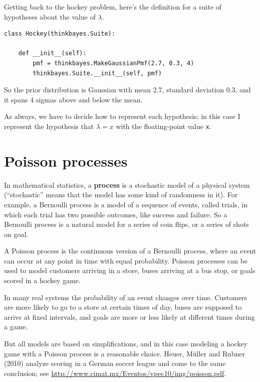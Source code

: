\documentclass[12pt]{book}
\begin{document}
Getting back to the hockey problem, here's the definition for a suite
of hypotheses about the value of $\lambda$.

\begin{verbatim}
class Hockey(thinkbayes.Suite):

    def __init__(self):
        pmf = thinkbayes.MakeGaussianPmf(2.7, 0.3, 4)
        thinkbayes.Suite.__init__(self, pmf)
\end{verbatim}  

So the prior distribution is Gaussian with mean 2.7, standard deviation
0.3, and it spans 4 sigmas above and below the mean.

As always, we have to decide how to represent each hypothesis; in
this case I represent the hypothesis that $\lambda=x$ with the
floating-point value {\tt x}. 


\section{Poisson processes}

In mathematical statistics, a {\bf process} is a stochastic model of a
physical system (``stochastic'' means that the model has some kind of
randomness in it).  For example, a Bernoulli process is a model of a
sequence of events, called trials, in which each trial has two
possible outcomes, like success and failure.  So a Bernoulli process
is a natural model for a series of coin flips, or a series of shots on
goal.   

A Poisson process is the continuous version of a Bernoulli process,
where an event can occur at any point in time with equal probability.
Poisson processes can be used to model customers arriving in a store,
buses arriving at a bus stop, or goals scored in a hockey game.

In many real systems the probability of an event changes over time.
Customers are more likely to go to a store at certain times of day,
buses are supposed to arrive at fixed intervals, and goals are more
or less likely at different times during a game.

But all models are based on simplifications, and in this case modeling
a hockey game with a Poisson process is a reasonable choice.  Heuer,
M\"{u}ller and Rubner (2010) analyze scoring in a German soccer league
and come to the same conclusion; see
\url{http://www.cimat.mx/Eventos/vpec10/img/poisson.pdf}.
\end{document}
